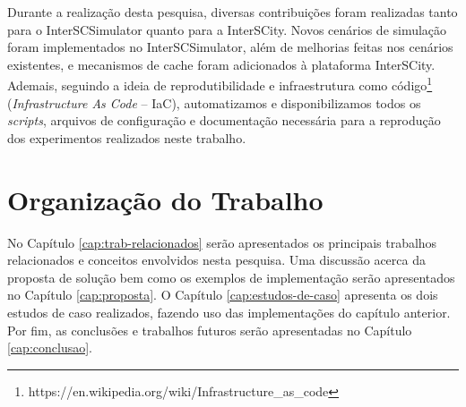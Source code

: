 Durante a realização desta pesquisa, diversas contribuições foram realizadas tanto para o InterSCSimulator quanto para a InterSCity.
Novos cenários de simulação foram implementados no InterSCSimulator, além de melhorias feitas nos cenários existentes, e mecanismos de cache foram adicionados à plataforma InterSCity.
Ademais, seguindo a ideia de reprodutibilidade e infraestrutura como código\footnote{https://en.wikipedia.org/wiki/Infrastructure\_as\_code} (\textit{Infrastructure As Code} -- IaC), automatizamos e
disponibilizamos todos os \textit{scripts}, arquivos de configuração e documentação necessária para a reprodução dos experimentos realizados neste trabalho.


\section{Organização do Trabalho}

No Capítulo \ref{cap:trab-relacionados} serão apresentados os principais trabalhos relacionados e conceitos envolvidos nesta pesquisa.
Uma discussão acerca da proposta de solução bem como os exemplos de implementação serão apresentados no Capítulo \ref{cap:proposta}.
O Capítulo \ref{cap:estudos-de-caso} apresenta os dois estudos de caso realizados, fazendo uso das implementações do capítulo anterior.
Por fim, as conclusões e trabalhos futuros serão apresentadas no Capítulo \ref{cap:conclusao}.
